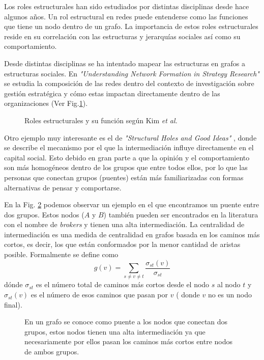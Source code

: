 Los roles estructurales han sido estudiados por distintas disciplinas desde hace algunos años. Un rol estructural en redes puede entenderse como las funciones que tiene un nodo dentro de un grafo. La importancia de estos roles estructurales reside en su correlación con las estructuras y jerarquías sociales así como su comportamiento. 

Desde distintas disciplinas se ha intentado mapear las estructuras en grafos a estructuras sociales. En \textit{"Understanding Network Formation in Strategy Research"} \cite{rose_kim_understanding_2016} se estudia la composición de las redes dentro del contexto de investigación sobre gestión estratégica y cómo estas impactan directamente dentro de las organizaciones (Ver Fig.\ref{fig:rosekim}).

 \begin{figure}[htbp]
   \centering
   
    \caption{Roles estructurales y su función según Kim \textit{et al.} \cite{rose_kim_understanding_2016}} %
    \label{fig:rosekim}
\end{figure}

Otro ejemplo muy interesante es el de \textit{"Structural Holes and Good Ideas"} \cite{burt_structural_2004}, donde se describe el mecanismo por el que la intermediación influye directamente en el capital social. Esto debido en gran parte a que la opinión y el comportamiento son más homogéneos dentro de los grupos que entre todos ellos, por lo que las personas que conectan grupos (puentes) están más familiarizadas con formas alternativas de pensar y comportarse. 

En la Fig. \ref{fig:broker} podemos observar un ejemplo en el que encontramos un puente entre dos grupos.  Estos nodos ($A$ y $B$) también pueden ser encontrados en la literatura con el nombre de \textit{brokers} y tienen una alta intermediación. La centralidad de intermediación es una medida de centralidad en grafos basada en los caminos más cortos, es decir, los que están conformados por la menor cantidad de aristas posible. Formalmente se define como $$g(v)=\sum _{{s\neq v\neq t}}{\frac{\sigma _{{st}}(v)}{\sigma _{{st}}}}$$ dónde $\sigma_{st}$ es el número total de caminos más cortos desde el nodo $s$ al nodo $t$ y
$\sigma_{st}(v)$ es el número de esos caminos que pasan por $v$ ( donde $v$ no es un nodo final).

 \begin{figure}[htbp]
   \centering
   
    \caption{En un grafo se conoce como puente a los nodos que conectan dos grupos, estos nodos tienen una alta intermediación ya que necesariamente por ellos pasan los caminos más cortos entre nodos de ambos grupos.}
    \label{fig:broker}
\end{figure}

